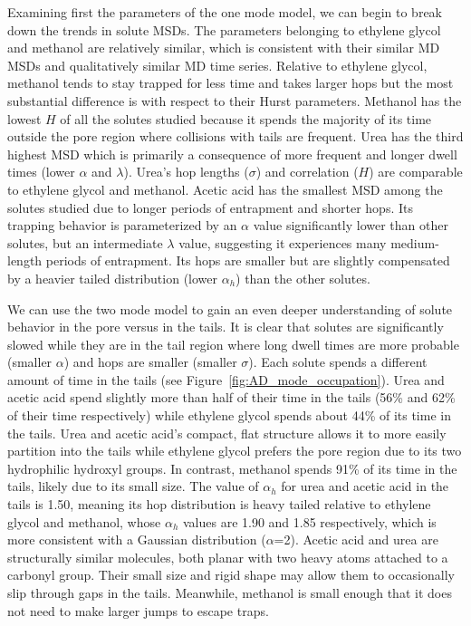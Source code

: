 \documentclass[journal=ancac3,manuscript=article,layout=twocolumn]{achemso}
\begin{document}
  Examining first the parameters of the one mode model, we can begin to break
  down the trends in solute MSDs. The parameters belonging to ethylene glycol
  and methanol are relatively similar, which is consistent with their similar MD
  MSDs and qualitatively similar MD time series.
  Relative to ethylene glycol, methanol tends to stay trapped for less
  time and takes larger hops but the most substantial difference is with
  respect to their Hurst parameters. Methanol has the lowest $H$ of all the
  solutes studied because it spends the majority of its time outside the pore
  region where collisions with tails are frequent.
  Urea has the third highest MSD which is primarily a consequence of more
  frequent and longer dwell times (lower $\alpha$ and $\lambda$). Urea's hop
  lengths ($\sigma$) and correlation ($H$) are comparable to ethylene glycol
  and methanol. Acetic acid has the smallest MSD among the solutes studied due
  to longer periods of entrapment and shorter hops. Its trapping behavior is
  parameterized by an $\alpha$ value significantly lower than other solutes,
  but an intermediate $\lambda$ value, suggesting it experiences many
  medium-length periods of entrapment. Its hops are smaller but are slightly
  compensated by a heavier tailed distribution (lower $\alpha_h$) than the
  other solutes. 
  
  We can use the two mode model to gain an even deeper understanding of solute
  behavior in the pore versus in the tails. It is clear that solutes are
  significantly slowed while they are in the tail region where long dwell times
  are more probable (smaller $\alpha$) and hops are smaller (smaller $\sigma$).
  Each solute spends a different amount of time in the tails (see
  Figure~\ref{fig:AD_mode_occupation}). Urea and acetic acid spend slightly
  more than half of their time in the tails (56\% and 62\% of their time
  respectively) while ethylene glycol spends about 44\% of its time in the
  tails. Urea and acetic acid's compact, flat structure allows it to more
  easily partition into the tails while ethylene glycol prefers the pore region
  due to its two hydrophilic hydroxyl groups. In contrast, methanol spends 91\%
  of its time in the tails, likely due to its small size. The value of
  $\alpha_h$ for urea and acetic acid in the tails is 1.50, meaning its hop
  distribution is heavy tailed relative to ethylene glycol and methanol, whose
  $\alpha_h$ values are 1.90 and 1.85 respectively, which is more consistent
  with a Gaussian distribution ($\alpha$=2). Acetic acid and urea are
  structurally similar molecules, both planar with two heavy atoms attached to
  a carbonyl group. Their small size and rigid shape may allow them to
  occasionally slip through gaps in the tails. Meanwhile, methanol is small
  enough that it does not need to make larger jumps to escape traps.
\end{document}
